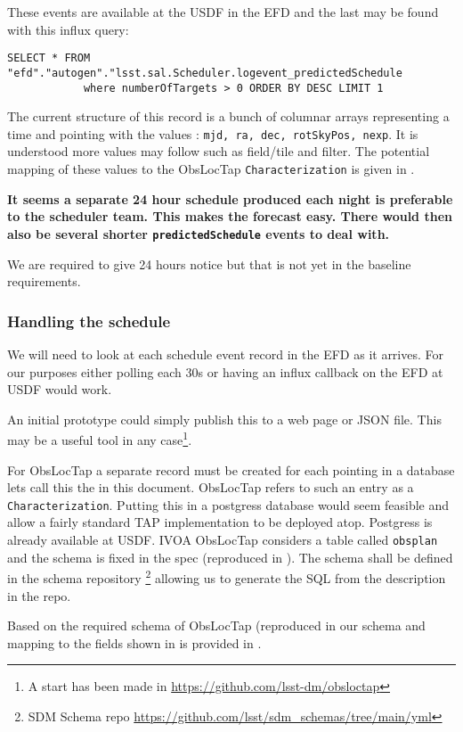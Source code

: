 These events are available at the USDF in the EFD and the last may be found with this influx query:
\begin{lstlisting}
SELECT * FROM "efd"."autogen"."lsst.sal.Scheduler.logevent_predictedSchedule
            where numberOfTargets > 0 ORDER BY DESC LIMIT 1
\end{lstlisting}

The current structure of this record is a bunch of columnar arrays representing a time and pointing with the
values : \texttt{mjd, ra, dec, rotSkyPos, nexp}.
It is understood more values may follow such as field/tile and filter.
The potential mapping of these values to the ObsLocTap \texttt{Characterization} is given in .


{\bf It seems a separate 24 hour schedule produced each night is preferable to the scheduler team. This makes the forecast easy. There would then also be several shorter \texttt{predictedSchedule} events to deal with. }

We are required to give 24 hours notice but that is not yet in the  baseline requirements.
\subsubsection{Handling the schedule}
We will need to look at each schedule event record in the EFD as it arrives.
For our purposes either polling each 30s or having an influx callback on the EFD at USDF would
work.

An initial prototype could simply publish this to a web page or JSON file.
This may be a useful tool in any case\footnote{A start has been made in \url{https://github.com/lsst-dm/obsloctap}}.


For ObsLocTap a separate record must be created for each pointing in a database lets call this the \DB in this document.
ObsLocTap refers to such an entry as a \texttt{ Characterization}.
Putting this in a postgress database would seem feasible and allow a fairly standard TAP implementation to be deployed atop.
Postgress is already available at USDF.
IVOA ObsLocTap considers a table called \texttt{obsplan} and the schema is fixed in the spec (reproduced in ).
The schema shall be  defined in the schema repository
\footnote{ SDM Schema repo \url{https://github.com/lsst/sdm_schemas/tree/main/yml}}
 allowing us to generate the SQL from the description in the repo.

Based on the required schema of ObsLocTap (reproduced in  our schema and mapping to the fields shown in  is provided in .

